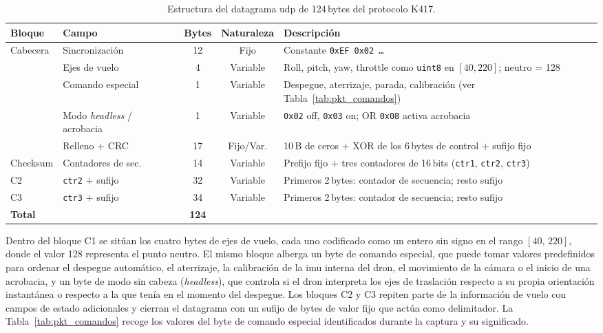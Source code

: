 \documentclass[12pt]{article}
\begin{document}
\begin{table}[htbp]
\centering
\caption{Estructura del datagrama \gls{udp} de 124\,bytes del protocolo K417.}
\label{tab:pkt_estructura}
\setlength{\tabcolsep}{8pt}
\renewcommand{\arraystretch}{1.25}
\begin{tabular}{@{}llccp{5.2cm}@{}}
\toprule
\textbf{Bloque} & \textbf{Campo} & \textbf{Bytes} & \textbf{Naturaleza} & \textbf{Descripción} \\
\midrule
Cabecera
  & Sincronización     & 12 & Fijo     & Constante \texttt{0xEF\,0x02\,\ldots} \\
\midrule
\rowcolor{rowgray}
\multirow{4}{*}{C1}
  & Ejes de vuelo      &  4 & Variable & Roll, pitch, yaw, throttle como \texttt{uint8} en $[40,220]$; neutro = 128 \\
  & Comando especial   &  1 & Variable & Despegue, aterrizaje, parada, calibración (ver Tabla~\ref{tab:pkt_comandos}) \\
\rowcolor{rowgray}
  & Modo \textit{headless} / acrobacia & 1 & Variable & \texttt{0x02} off, \texttt{0x03} on; OR \texttt{0x08} activa acrobacia \\
  & Relleno + CRC      & 17 & Fijo/Var.& 10\,B de ceros + XOR de los 6\,bytes de control + sufijo fijo \\
\midrule
Checksum
  & Contadores de sec. & 14 & Variable & Prefijo fijo + tres contadores de 16\,bits (\texttt{ctr1}, \texttt{ctr2}, \texttt{ctr3}) \\
\midrule
C2
  & \texttt{ctr2} + sufijo & 32 & Variable & Primeros 2\,bytes: contador de secuencia; resto sufijo \\
C3
  & \texttt{ctr3} + sufijo & 34 & Variable & Primeros 2\,bytes: contador de secuencia; resto sufijo \\
\midrule
\textbf{Total} & & \textbf{124} & & \\
\bottomrule
\end{tabular}
\end{table}

Dentro del bloque C1 se sitúan los cuatro bytes de ejes de vuelo, cada uno codificado como un entero sin signo en el rango $[40,\,220]$, donde el valor 128 representa el punto neutro. El mismo bloque alberga un byte de comando especial, que puede tomar valores predefinidos para ordenar el despegue automático, el aterrizaje, la calibración de la \gls{imu} interna del dron, el movimiento de la cámara o el inicio de una acrobacia, y un byte de modo sin cabeza (\textit{headless}), que controla si el dron interpreta los ejes de traslación respecto a su propia orientación instantánea o respecto a la que tenía en el momento del despegue. Los bloques C2 y C3 repiten parte de la información de vuelo con campos de estado adicionales y cierran el datagrama con un sufijo de bytes de valor fijo que actúa como delimitador. La Tabla~\ref{tab:pkt_comandos} recoge los valores del byte de comando especial identificados durante la captura y su significado.
\end{document}

